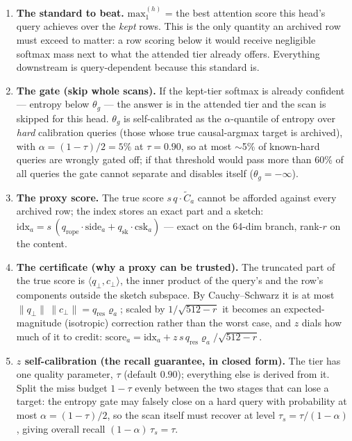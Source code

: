\documentclass[11pt]{article}
\begin{document}
\begin{enumerate}[itemsep=1pt]
\item \textbf{The standard to beat.} $\mathrm{max}_1^{(h)}$ = the best
attention score this head's query achieves over the \emph{kept} rows. This
is the only quantity an archived row must exceed to matter: a row scoring
below it would receive negligible softmax mass next to what the attended
tier already offers. Everything downstream is query-dependent because this
standard is.
\item \textbf{The gate (skip whole scans).} If the kept-tier softmax is
already confident --- entropy below $\theta_g$ --- the answer is in the
attended tier and the scan is skipped for this head. $\theta_g$ is
self-calibrated as the $\alpha$-quantile of entropy over \emph{hard}
calibration queries (those whose true causal-argmax target is archived),
with $\alpha = (1-\tau)/2 = 5\%$ at $\tau=0.90$, so
at most $\sim$5\% of known-hard queries are wrongly gated off; if that
threshold would pass more than 60\% of all queries the gate cannot separate
and disables itself ($\theta_g = -\infty$).
\item \textbf{The proxy score.} The true score $s\,q\cdot\tilde C_a$ cannot
be afforded against every archived row; the index stores an exact part and
a sketch: $\mathrm{idx}_a = s\,(q_{\mathrm{rope}}\!\cdot\!\mathrm{side}_a +
q_{\mathrm{sk}}\!\cdot\!\mathrm{csk}_a)$ --- exact on the 64-dim branch,
rank-$r$ on the content.
\item \textbf{The certificate (why a proxy can be trusted).} The truncated
part of the true score is $\langle q_\perp, c_\perp\rangle$, the inner
product of the query's and the row's components outside the sketch
subspace. By Cauchy--Schwarz it is at most
$\lVert q_\perp\rVert\,\lVert c_\perp\rVert = q_{\mathrm{res}}\varrho_a$;
scaled by $1/\sqrt{512-r}$ it becomes an expected-magnitude (isotropic)
correction rather than the worst case, and $z$ dials how much of it to
credit: $\mathrm{score}_a = \mathrm{idx}_a + z\,s\,q_{\mathrm{res}}
\varrho_a/\sqrt{512-r}$.
\item \textbf{$z$ self-calibration (the recall guarantee, in closed form).}
The tier has one quality parameter, $\tau$ (default $0.90$); everything else
is derived from it. Split the miss budget $1-\tau$ evenly between the two
stages that can lose a target: the entropy gate may falsely close on a hard
query with probability at most $\alpha = (1-\tau)/2$, so the scan itself must
recover at level $\tau_s = \tau/(1-\alpha)$, giving overall recall
$(1-\alpha)\,\tau_s = \tau$.


\end{enumerate}
\end{document}

